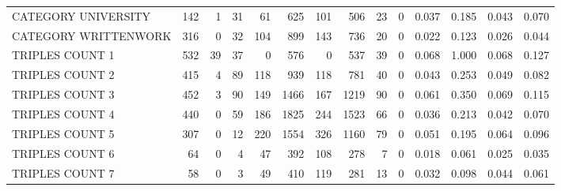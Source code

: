 \begin{tabular}{lrrrrrrrrrllll}
 CATEGORY UNIVERSITY      &             142 &             1 &              31 &              61 &             625 &  101 &  506 &   23 &    0 & 0.037 & 0.185 & 0.043 & 0.070 \\
 CATEGORY WRITTENWORK     &             316 &             0 &              32 &             104 &             899 &  143 &  736 &   20 &    0 & 0.022 & 0.123 & 0.026 & 0.044 \\
 TRIPLES COUNT 1          &             532 &            39 &              37 &               0 &             576 &    0 &  537 &   39 &    0 & 0.068 & 1.000 & 0.068 & 0.127 \\
 TRIPLES COUNT 2          &             415 &             4 &              89 &             118 &             939 &  118 &  781 &   40 &    0 & 0.043 & 0.253 & 0.049 & 0.082 \\
 TRIPLES COUNT 3          &             452 &             3 &              90 &             149 &            1466 &  167 & 1219 &   90 &    0 & 0.061 & 0.350 & 0.069 & 0.115 \\
 TRIPLES COUNT 4          &             440 &             0 &              59 &             186 &            1825 &  244 & 1523 &   66 &    0 & 0.036 & 0.213 & 0.042 & 0.070 \\
 TRIPLES COUNT 5          &             307 &             0 &              12 &             220 &            1554 &  326 & 1160 &   79 &    0 & 0.051 & 0.195 & 0.064 & 0.096 \\
 TRIPLES COUNT 6          &              64 &             0 &               4 &              47 &             392 &  108 &  278 &    7 &    0 & 0.018 & 0.061 & 0.025 & 0.035 \\
 TRIPLES COUNT 7          &              58 &             0 &               3 &              49 &             410 &  119 &  281 &   13 &    0 & 0.032 & 0.098 & 0.044 & 0.061 \\
\hline
\end{tabular}